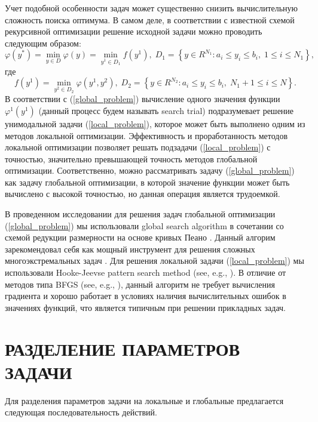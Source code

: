 \documentclass{aip-cp}
\begin{document}
Учет подобной особенности задач может существенно снизить вычислительную сложность поиска оптимума. В самом деле, в соответствии с известной схемой рекурсивной оптимизации \cite{Carr} решение исходной задачи можно проводить следующим образом:
\begin{equation}\label{global_problem}
\varphi(y^*) = \min_{y\in D} \varphi (y) = \min_{y^1\in D_1} f(y^1), \; D_1=\left\{y\in R^{N_1}: a_i\leq y_i \leq b_i, \; 1\leq i \leq N_1\right\},
\end{equation}
где 
\begin{equation}\label{local_problem}
f(y^1) = \min_{ y^2 \in D_2} \varphi(y^1,y^2), \; D_2=\left\{y\in R^{N_2}: a_i\leq y_i \leq b_i, \; N_1+1\leq i \leq N\right\}.
\end{equation}
В соответствии с (\ref{global_problem}) вычисление одного значения функции $\varphi^1 (y^1)$ (данный процесс будем называть search trial) подразумевает решение унимодальной задачи (\ref{local_problem}), которое может быть выполнено одним из методов локальной оптимизации. Эффективность и проработанность методов локальной оптимизации позволяет решать подзадачи (\ref{local_problem}) с точностью, значительно превышающей точность методов глобальной оптимизации. Соответственно, можно рассматривать задачу (\ref{global_problem}) как задачу глобальной оптимизации, в которой значение функции может быть вычислено с высокой точностью, но данная операция является трудоемкой. 

В проведенном исследовании для решения задач глобальной оптимизации (\ref{global_problem}) мы использовали global search algorithm в сочетании со схемой редукции размерности на основе кривых Пеано \cite{Sergeyev2013,Lera2021}. Данный алгорим зарекомендовал себя как мощный инструмент для решения сложных многоэкстремальных задач \cite{Kvasov2013,Kalyulin2017,Cavoretto2021}.
Для решения локальной задачи (\ref{local_problem}) мы использовали Hooke-Jeevse pattern search method (see, e.g., \cite{Kelley}). В отличие от методов типа BFGS (see, e.g., \cite{Nocedal}), данный алгоритм не требует вычисления градиента и хорошо работает в условиях наличия вычислительных ошибок в значениях функций, что является типичным при решении прикладных задач.

\section{РАЗДЕЛЕНИЕ ПАРАМЕТРОВ ЗАДАЧИ}

Для разделения параметров задачи на локальные и глобальные предлагается следующая последовательность действий.
\end{document}
